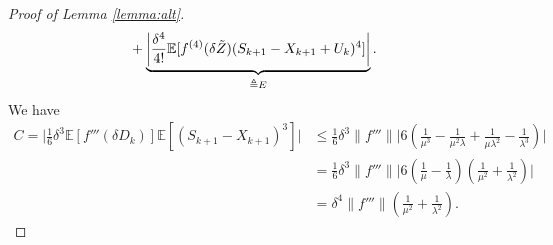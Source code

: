 \documentclass[11pt,letterpaper,reqno]{article}
\theoremstyle{thmstyleone}%
\theoremstyle{thmstyletwo}%
\theoremstyle{thmstylethree}%
\numberwithin{equation}{section}
\begin{document}
\begin{proof}[Proof of Lemma \ref{lemma:alt}]
\begin{align}
      &+\underbrace{\bigg|\frac{\delta^4}{4!}\mathbb E[f^{(4)}(\delta \Tilde{Z})(S_{k+1}-X_{k+1}+U_k)^4]\bigg|}_{\triangleq E}.
\end{align}
We have 
\begin{align}\label{lnCbound}
   C= \bigg| \frac{1}{6}\delta^3\mathbb E[f'''(\delta D_k)]\mathbb E[(S_{k+1}-X_{k+1})^3]\bigg| &\leq  \frac{1}{6}\delta^3 \|f'''\| \bigg|6 \left(\frac{1}{\mu^3}-\frac{1}{\mu^2\lambda}+\frac{1}{\mu\lambda^2} -\frac{1}{\lambda^3}\right)\bigg| \nonumber\\
    &= \frac{1}{6}\delta^3 \|f'''\| \bigg|6 \left(\frac{1}{\mu}-\frac{1}{\lambda}\right)\left(\frac{1}{\mu^2}+\frac{1}{\lambda^2}\right)\bigg| \nonumber\\
    &=\delta^4 \|f'''\|\left(\frac{1}{\mu^2}+\frac{1}{\lambda^2}\right).
\end{align}


\end{proof}
\end{document}
